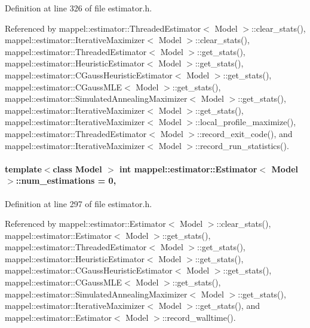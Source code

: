 Definition at line 326 of file estimator.\+h.



Referenced by mappel\+::estimator\+::\+Threaded\+Estimator$<$ Model $>$\+::clear\+\_\+stats(), mappel\+::estimator\+::\+Iterative\+Maximizer$<$ Model $>$\+::clear\+\_\+stats(), mappel\+::estimator\+::\+Threaded\+Estimator$<$ Model $>$\+::get\+\_\+stats(), mappel\+::estimator\+::\+Heuristic\+Estimator$<$ Model $>$\+::get\+\_\+stats(), mappel\+::estimator\+::\+C\+Gauss\+Heuristic\+Estimator$<$ Model $>$\+::get\+\_\+stats(), mappel\+::estimator\+::\+C\+Gauss\+M\+L\+E$<$ Model $>$\+::get\+\_\+stats(), mappel\+::estimator\+::\+Simulated\+Annealing\+Maximizer$<$ Model $>$\+::get\+\_\+stats(), mappel\+::estimator\+::\+Iterative\+Maximizer$<$ Model $>$\+::get\+\_\+stats(), mappel\+::estimator\+::\+Iterative\+Maximizer$<$ Model $>$\+::local\+\_\+profile\+\_\+maximize(), mappel\+::estimator\+::\+Threaded\+Estimator$<$ Model $>$\+::record\+\_\+exit\+\_\+code(), and mappel\+::estimator\+::\+Iterative\+Maximizer$<$ Model $>$\+::record\+\_\+run\+\_\+statistics().

\paragraph[{\texorpdfstring{num\+\_\+estimations}{num_estimations}}]{\setlength{\rightskip}{0pt plus 5cm}template$<$class Model $>$ int {\bf mappel\+::estimator\+::\+Estimator}$<$ Model $>$\+::num\+\_\+estimations = 0\hspace{0.3cm}{\ttfamily [protected]}, {\ttfamily [inherited]}}\hypertarget{classmappel_1_1estimator_1_1Estimator_a9f5390f0ac3ee127ddcd90dc6f4fd889}{}\label{classmappel_1_1estimator_1_1Estimator_a9f5390f0ac3ee127ddcd90dc6f4fd889}


Definition at line 297 of file estimator.\+h.



Referenced by mappel\+::estimator\+::\+Estimator$<$ Model $>$\+::clear\+\_\+stats(), mappel\+::estimator\+::\+Estimator$<$ Model $>$\+::get\+\_\+stats(), mappel\+::estimator\+::\+Threaded\+Estimator$<$ Model $>$\+::get\+\_\+stats(), mappel\+::estimator\+::\+Heuristic\+Estimator$<$ Model $>$\+::get\+\_\+stats(), mappel\+::estimator\+::\+C\+Gauss\+Heuristic\+Estimator$<$ Model $>$\+::get\+\_\+stats(), mappel\+::estimator\+::\+C\+Gauss\+M\+L\+E$<$ Model $>$\+::get\+\_\+stats(), mappel\+::estimator\+::\+Simulated\+Annealing\+Maximizer$<$ Model $>$\+::get\+\_\+stats(), mappel\+::estimator\+::\+Iterative\+Maximizer$<$ Model $>$\+::get\+\_\+stats(), and mappel\+::estimator\+::\+Estimator$<$ Model $>$\+::record\+\_\+walltime().


